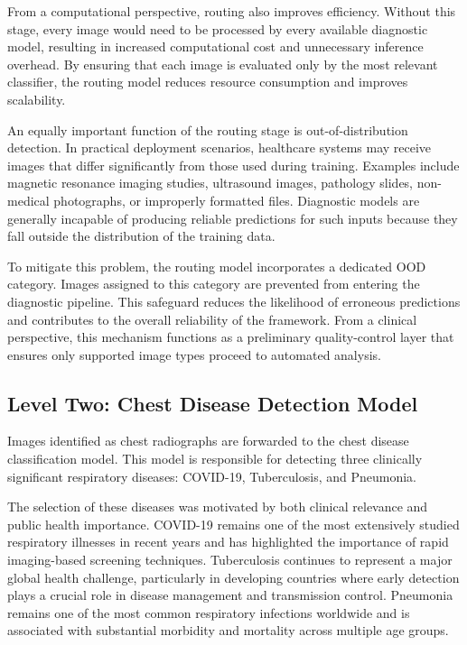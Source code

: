 From a computational perspective, routing also improves efficiency. Without this stage, every image would need to be processed by every available diagnostic model, resulting in increased computational cost and unnecessary inference overhead. By ensuring that each image is evaluated only by the most relevant classifier, the routing model reduces resource consumption and improves scalability.

An equally important function of the routing stage is out-of-distribution detection. In practical deployment scenarios, healthcare systems may receive images that differ significantly from those used during training. Examples include magnetic resonance imaging studies, ultrasound images, pathology slides, non-medical photographs, or improperly formatted files. Diagnostic models are generally incapable of producing reliable predictions for such inputs because they fall outside the distribution of the training data.

To mitigate this problem, the routing model incorporates a dedicated OOD category. Images assigned to this category are prevented from entering the diagnostic pipeline. This safeguard reduces the likelihood of erroneous predictions and contributes to the overall reliability of the framework. From a clinical perspective, this mechanism functions as a preliminary quality-control layer that ensures only supported image types proceed to automated analysis.

\subsection{Level Two: Chest Disease Detection Model}

Images identified as chest radiographs are forwarded to the chest disease classification model. This model is responsible for detecting three clinically significant respiratory diseases: COVID-19, Tuberculosis, and Pneumonia.

The selection of these diseases was motivated by both clinical relevance and public health importance. COVID-19 remains one of the most extensively studied respiratory illnesses in recent years and has highlighted the importance of rapid imaging-based screening techniques. Tuberculosis continues to represent a major global health challenge, particularly in developing countries where early detection plays a crucial role in disease management and transmission control. Pneumonia remains one of the most common respiratory infections worldwide and is associated with substantial morbidity and mortality across multiple age groups.

